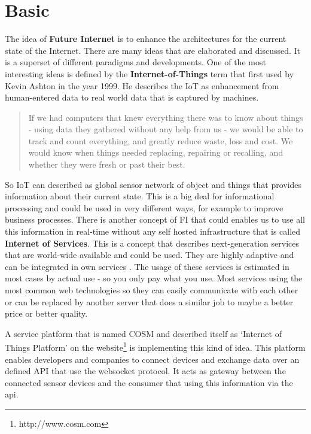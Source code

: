 \documentclass{acm_proc_article-sp}
\begin{document}
\section{Basic}
\label{sec:Basics}

The idea of \textbf{Future Internet} is to enhance the architectures for the current state of the Internet. There are many ideas that are elaborated and discussed. It is a superset of different paradigms and developments. 
One of the most interesting ideas is defined by the \textbf{Internet-of-Things} term that first used by Kevin Ashton in the year 1999. He describes the IoT as enhancement from human-entered data to real world data that is captured by machines.
\begin{quote}
If we had computers that knew everything there was to know about things - using data they gathered without any help from us - we would be able to track and count everything, and greatly reduce waste, loss and cost. We would know when things needed replacing, repairing or recalling, and whether they were fresh or past their best. \cite{iot_thing:Ashton}
\end{quote}
So IoT can described as global sensor network of object and things that provides information about their current state. This is a big deal for informational processing and could be used in very different ways, for example to improve business processes.
There is another concept of FI that could enables us to use all this information in real-time without any self hosted infrastructure that is called \textbf{Internet of Services}. 
This is a concept that describes next-generation services that are world-wide available and could be used. They are highly adaptive and can be integrated in own services \cite{future_Internet:shenker}.
The usage of these services is estimated in most cases by actual use - so you only pay what you use. Most services using the most common web technologies so they can easily communicate with each other or can be replaced by another server that does a similar job to maybe a better price or better quality.

A service platform that is named COSM and described itself as `Internet of Things Platform' on the website\footnote{http://www.cosm.com} is implementing this kind of idea. This platform enables developers and companies to connect devices and exchange data over an defined API that use the websocket protocol.
It acts as gateway between the connected sensor devices and the consumer that using this information via the api. 
\end{document}

